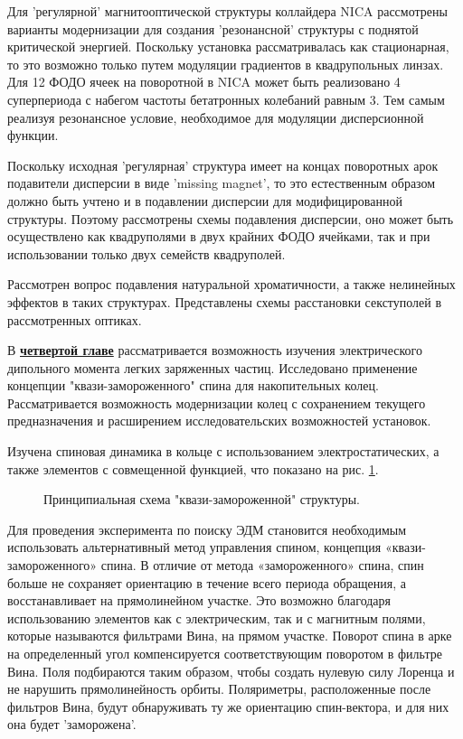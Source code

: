 \par Для 'регулярной' магнитооптической структуры коллайдера NICA рассмотрены варианты модернизации для создания 'резонансной' структуры с поднятой критической энергией. Поскольку установка рассматривалась как стационарная, то это возможно только путем модуляции градиентов в квадрупольных линзах. Для 12 ФОДО ячеек на поворотной в NICA может быть реализовано 4 суперпериода с набегом частоты бетатронных колебаний равным 3. Тем самым реализуя резонансное условие, необходимое для модуляции дисперсионной функции.

\par Поскольку исходная 'регулярная' структура имеет на концах поворотных арок подавители дисперсии в виде 'missing magnet', то это естественным образом должно быть учтено и в подавлении дисперсии для модифицированной структуры. Поэтому рассмотрены схемы подавления дисперсии, оно может быть осуществлено как квадруполями в двух крайних ФОДО ячейками, так и при использовании только двух семейств квадруполей. 

\par Рассмотрен вопрос подавления натуральной хроматичности, а также нелинейных эффектов в таких структурах. Представлены схемы расстановки секступолей в рассмотренных оптиках.

В \underline{\textbf{четвертой главе}} рассматривается возможность изучения электрического дипольного момента легких заряженных частиц. Исследовано применение концепции "квази-замороженного" спина для накопительных колец. Рассматривается возможность модернизации колец с сохранением текущего предназначения  и расширением исследовательских возможностей установок.
\par Изучена спиновая динамика в кольце с использованием электростатических, а также элементов с совмещенной функцией, что по­казано на рис. \ref{fig:QFS}.

\begin{figure}[ht]
    \caption{Принципиальная схема "квази-замороженной" структуры.}\label{fig:QFS}
\end{figure}

\par Для проведения эксперимента по поиску ЭДМ становится необходимым использовать альтернативный метод управления спином, концепция «квази-замороженного» спина. В отличие от метода «замороженного» спина, спин больше не сохраняет ориентацию в течение всего периода обращения, а восстанавливает на прямолинейном участке. Это возможно благодаря использованию элементов как с электрическим, так и с магнитным полями, которые называются фильтрами Вина, на прямом участке. Поворот спина в арке на определенный угол компенсируется соответствующим поворотом в фильтре Вина. Поля подбираются таким образом, чтобы создать нулевую силу Лоренца и не нарушить прямолинейность орбиты. Поляриметры, расположенные после фильтров Вина, будут обнаруживать ту же ориентацию спин-вектора, и для них она будет 'заморожена'.

